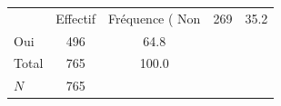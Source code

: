 {
\def\sym#1{\ifmmode^{#1}\else\(^{#1}\)\fi}
\begin{tabular}{l*{1}{cc}}
\toprule
            &    Effectif&Fréquence (%
\midrule
Non         &         269&        35.2\\
Oui         &         496&        64.8\\
Total       &         765&       100.0\\
\midrule
\(N\)       &         765&            \\
\bottomrule
\end{tabular}
}

